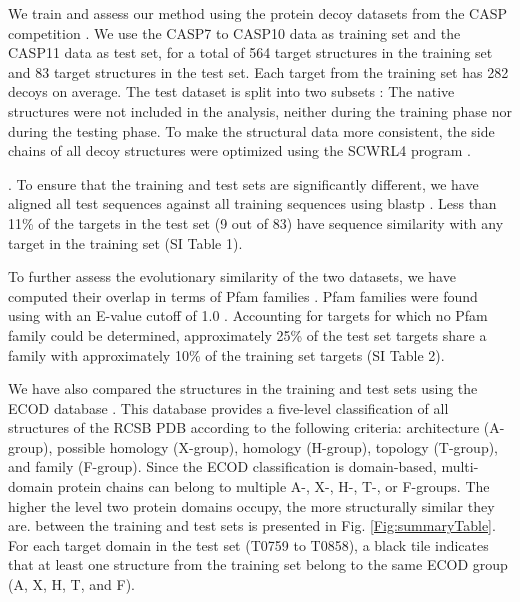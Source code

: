 
We train and assess our method using the protein decoy datasets from
the CASP competition \cite{moult2014critical}.  We use the CASP7 to
CASP10 data as training set and the CASP11 data as test set, for a
total of 564 target structures in the training set and 83 target
structures in the test set. Each target from the training set has 282
decoys on average.
%
The test dataset is split into two subsets \cite{kryshtafovych2015}:
%
The native structures were not included in the analysis, neither
during the training phase nor during the testing phase. To make the
structural data more consistent, the side chains of all decoy
structures were optimized using the SCWRL4 program
\cite{krivov2009improved}.

. 
To ensure that the training and test sets are significantly different, we have aligned all test
sequences against all training sequences using blastp \cite{altschul1990basic}. 
Less than 11\% of the targets in the test set (9 out of 83) have sequence
similarity with any target in the training set (SI Table 1).

To further assess the evolutionary similarity of the two datasets, we
have computed their overlap in terms of Pfam families
\cite{finn2016pfam}. Pfam families were found using 
with an E-value cutoff of 1.0 \cite{finn2016pfam}.  
Accounting for targets for which no Pfam family could
be determined, approximately 25\% of the test set targets share a
family with approximately 10\% of the training set targets (SI Table 2).

We have also compared the structures in the training and test sets
using the ECOD database \cite{cheng2014ecod}. This database provides a
five-level classification of all structures of the RCSB PDB
\cite{berman2000protein} according to the following criteria:
architecture (A-group), possible homology (X-group), homology
(H-group), topology (T-group), and family (F-group).  Since the ECOD
classification is domain-based, multi-domain protein chains can belong
to multiple A-, X-, H-, T-, or F-groups.  The higher the level two
protein domains occupy, the more structurally similar they are.
%
 between the training and test sets
is presented in Fig. \ref{Fig:summaryTable}. For each target domain in
the test set (T0759 to T0858), a black tile indicates that at least
one structure from the training set belong to the same ECOD group (A,
X, H, T, and F). 
%

